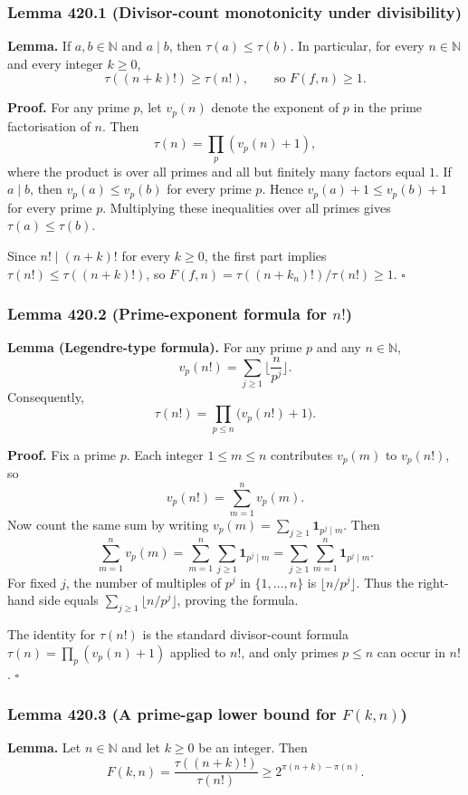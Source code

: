 \subsubsection*{Lemma 420.1 (Divisor-count monotonicity under divisibility)}
\textbf{Lemma.} If $a,b\in\mathbb{N}$ and $a\mid b$, then $\tau(a)\le \tau(b)$.
In particular, for every $n\in\mathbb{N}$ and every integer $k\ge 0$,
\[
\tau((n+k)!)\ge \tau(n!),\qquad\text{so }F(f,n)\ge 1.
\]

\textbf{Proof.}
For any prime $p$, let $v_p(n)$ denote the exponent of $p$ in the prime factorisation of $n$.
Then
\[
\tau(n)=\prod_{p} (v_p(n)+1),
\]
where the product is over all primes and all but finitely many factors equal $1$.
If $a\mid b$, then $v_p(a)\le v_p(b)$ for every prime $p$. Hence $v_p(a)+1\le v_p(b)+1$ for every prime $p$.
Multiplying these inequalities over all primes gives $\tau(a)\le \tau(b)$.

Since $n!\mid (n+k)!$ for every $k\ge 0$, the first part implies $\tau(n!)\le \tau((n+k)!)$, so $F(f,n)=\tau((n+k_n)!)/\tau(n!)\ge 1$.
\hfill$\square$

\subsubsection*{Lemma 420.2 (Prime-exponent formula for $n!$)}
\textbf{Lemma (Legendre-type formula).} For any prime $p$ and any $n\in\mathbb{N}$,
\[
v_p(n!)=\sum_{j\ge 1} \Big\lfloor\frac{n}{p^j}\Big\rfloor.
\]
Consequently,
\[
\tau(n!)=\prod_{p\le n}\big(v_p(n!)+1\big).
\]

\textbf{Proof.}
Fix a prime $p$. Each integer $1\le m\le n$ contributes $v_p(m)$ to $v_p(n!)$, so
\[
v_p(n!)=\sum_{m=1}^n v_p(m).
\]
Now count the same sum by writing $v_p(m)=\sum_{j\ge 1} \mathbf{1}_{p^j\mid m}$.
Then
\[
\sum_{m=1}^n v_p(m)=\sum_{m=1}^n \sum_{j\ge 1} \mathbf{1}_{p^j\mid m}
=\sum_{j\ge 1} \sum_{m=1}^n \mathbf{1}_{p^j\mid m}.
\]
For fixed $j$, the number of multiples of $p^j$ in $\{1,\dots,n\}$ is $\lfloor n/p^j\rfloor$.
Thus the right-hand side equals $\sum_{j\ge 1}\lfloor n/p^j\rfloor$, proving the formula.

The identity for $\tau(n!)$ is the standard divisor-count formula $\tau(n)=\prod_p (v_p(n)+1)$ applied to $n!$, and only primes $p\le n$ can occur in $n!$.
\hfill$\square$

\subsubsection*{Lemma 420.3 (A prime-gap lower bound for $F(k,n)$)}
\textbf{Lemma.} Let $n\in\mathbb{N}$ and let $k\ge 0$ be an integer. Then
\[
F(k,n)=\frac{\tau((n+k)!)}{\tau(n!)}\ge 2^{\pi(n+k)-\pi(n)}.
\]

